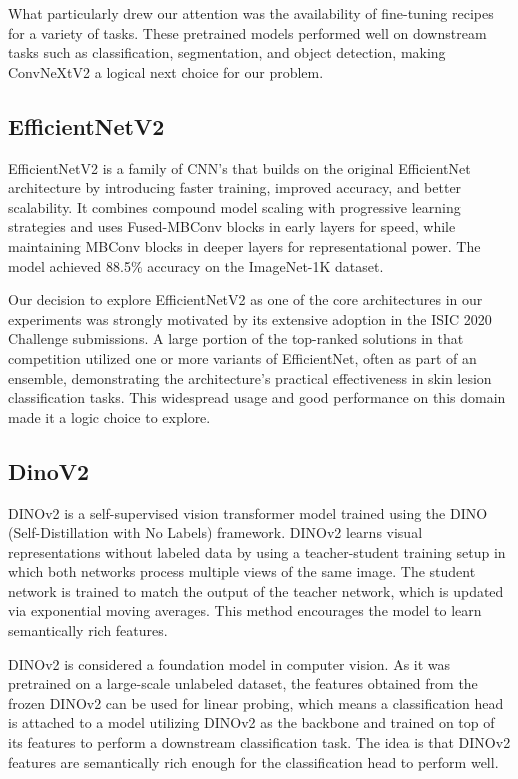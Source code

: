 What particularly drew our attention was the availability of fine-tuning recipes for a variety of tasks. These pretrained models performed well on downstream tasks such as classification, segmentation, and object detection, making ConvNeXtV2 a logical next choice for our problem.

\subsection{EfficientNetV2}

EfficientNetV2 \cite{efficientnetv2} is a family of CNN's that builds on the original EfficientNet architecture by introducing faster training, improved accuracy, and better scalability. It combines compound model scaling with progressive learning strategies and uses Fused-MBConv blocks in early layers for speed, while maintaining MBConv blocks in deeper layers for representational power. 
The model achieved 88.5\% accuracy on the ImageNet-1K dataset.

Our decision to explore EfficientNetV2 as one of the core architectures in our experiments was strongly motivated by its extensive adoption in the ISIC 2020 Challenge submissions. A large portion of the top-ranked solutions in that competition utilized one or more variants of EfficientNet, often as part of an ensemble, demonstrating the architecture’s practical effectiveness in skin lesion classification tasks. This widespread usage and good performance on this domain made it a logic choice to explore.


\subsection{DinoV2}

DINOv2 \cite{dinov2} is a self-supervised vision transformer model trained using the DINO (Self-Distillation with No Labels) framework. DINOv2 learns visual representations without labeled data by using a teacher-student training setup in which both networks process multiple views of the same image. The student network is trained to match the output of the teacher network, which is updated via exponential moving averages. This method encourages the model to learn semantically rich features.

DINOv2 is considered a foundation model in computer vision. As it was pretrained on a large-scale unlabeled dataset, the features obtained from the frozen DINOv2 can be used for linear probing, which means a classification head is attached to a model utilizing DINOv2 as the backbone and trained on top of its features to perform a downstream classification task. The idea is that DINOv2 features are semantically rich enough for the classification head to perform well.

